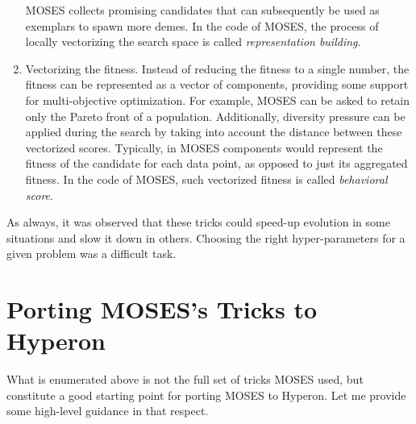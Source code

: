 \documentclass[]{report}
\begin{document}
\begin{enumerate}
  MOSES collects promising candidates that can subsequently be used as
  exemplars to spawn more demes.  In the code of MOSES, the process of
  locally vectorizing the search space is called \emph{representation
  building}.
\item Vectorizing the fitness.  Instead of reducing the fitness to a
  single number, the fitness can be represented as a vector of
  components, providing some support for multi-objective optimization.
  For example, MOSES can be asked to retain only the Pareto front of a
  population.  Additionally, diversity pressure can be applied during
  the search by taking into account the distance between these
  vectorized scores.  Typically, in MOSES components would represent
  the fitness of the candidate for each data point, as opposed to just
  its aggregated fitness.  In the code of MOSES, such vectorized
  fitness is called \emph{behavioral score}.
\end{enumerate}

As always, it was observed that these tricks could speed-up evolution
in some situations and slow it down in others.  Choosing the right
hyper-parameters for a given problem was a difficult task.

\section{Porting MOSES's Tricks to Hyperon}

What is enumerated above is not the full set of tricks MOSES used, but
constitute a good starting point for porting MOSES to Hyperon.  Let me
provide some high-level guidance in that respect.
\end{document}
